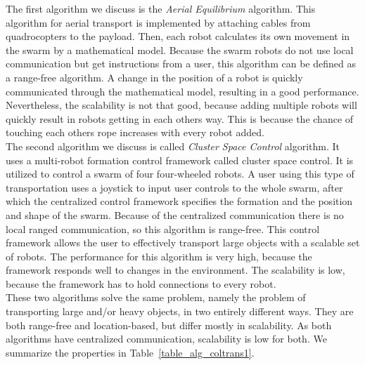 The first algorithm we discuss is the \emph{Aerial Equilibrium} algorithm. \cite{Michael2011cooperative}
This algorithm for aerial transport is implemented by attaching cables from quadrocopters to the payload.
Then, each robot calculates its own movement in the swarm by a mathematical model.
Because the swarm robots do not use local communication but get instructions from a user, this algorithm can be defined as a range-free algorithm.
A change in the position of a robot is quickly communicated through the mathematical model, resulting in a good performance.
Nevertheless, the scalability is not that good, because adding multiple robots will quickly result in robots getting in each others way.
This is because the chance of touching each others rope increases with every robot added. \\


The second algorithm we discuss is called \emph{Cluster Space Control} algorithm. \cite{mas2012object}
It uses a multi-robot formation control framework called cluster space control.
It is utilized to control a swarm of four four-wheeled robots.
A user using this type of transportation uses a joystick to input user controls to the whole swarm, after which the centralized control framework specifies the formation and the position and shape of the swarm.
Because of the centralized communication there is no local ranged communication, so this algorithm is range-free.
This control framework allows the user to effectively transport large objects with a scalable set of robots.
The performance for this algorithm is very high, because the framework responds well to changes in the environment.
The scalability is low, because the framework has to hold connections to every robot.\\


These two algorithms solve the same problem, namely the problem of transporting large and/or heavy objects, in two entirely different ways.
They are both range-free and location-based, but differ mostly in scalability.
As both algorithms have centralized communication, scalability is low for both.
We summarize the properties in Table~\ref{table_alg_coltrans1}.

\begin{table}[H]
  \renewcommand{\arraystretch}{1.3}
  \centering
  \caption{User-controlled swarm transportation algorithms}
  \label{table_alg_coltrans1}
\end{table}

